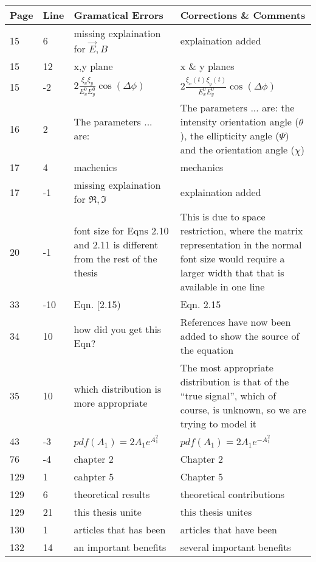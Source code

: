 \noindent
\begin{longtable}[c]{p{}|p{}|p{}|p{}}
\textbf{Page} & \textbf{Line} & \textbf{Gramatical Errors} & \textbf{Corrections \& Comments} \\
 \hline
 \endhead
15 & 6 & missing explaination for $\vec{E},B$ & explaination added \\
15 & 12 & x,y plane & x \& y planes \\
15 & -2 & $2 \frac{\xi_x \xi_y}{E_x^0 E_y^0} \cos (\Delta \phi)$ & $2 \frac{\xi_x(t) \xi_y(t)}{E_x^0 E_y^0} \cos (\Delta \phi)$ \\
16 & 2 & The parameters ... are: & The parameters ... are: the intensity orientation angle ($\theta$), the ellipticity angle ($\Psi$) and the orientation angle ($\chi$) \\
17 & 4 & machenics & mechanics \\
17 & -1 & missing explaination for $\Re,\Im$ & explaination added \\
20 & -1 & font size for Eqns 2.10 and 2.11 is different from the rest of the thesis & This is due to space restriction, where the matrix representation in the normal font size would require a larger width that that is available in one line \\
33 & -10 & Eqn. [2.15) & Eqn. 2.15 \\
34 & 10 & how did you get this Eqn? & References have now been added to show the source of the equation \\
35 & 10 & which distribution is more appropriate & The most appropriate distribution is that of the ``true signal'', which of course, is unknown, so we are trying to model it \\
43 & -3 & $pdf(A_1)=2A_1e^{A_1^2}$ & $pdf(A_1)=2A_1e^{-A_1^2}$ \\
76 & -4 & chapter 2 & Chapter 2 \\
129 & 1 & cahpter 5 & Chapter 5 \\
129 & 6 & theoretical results & theoretical contributions \\
129 & 21 & this thesis unite & this thesis unites \\
130 & 1 & articles that has been & articles that have been \\
132 & 14 & an important benefits & several important benefits \\
\end{longtable}    

